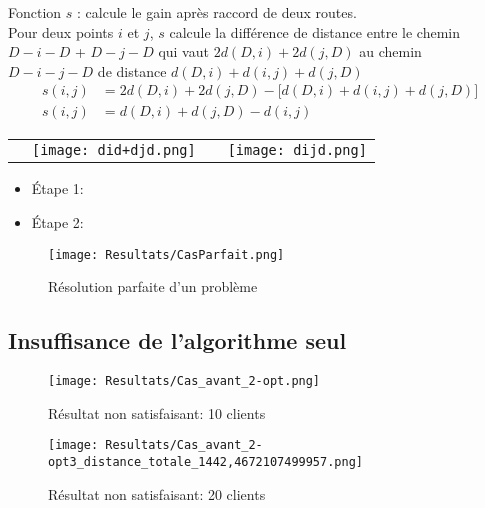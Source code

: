 \documentclass[10pt]{beamer}
\begin{document}
	\begin{frame}	
		\begin{definition}
			Fonction $s$ : calcule le gain après raccord de deux routes. \\Pour deux points $i$ et $j$, $s$ calcule la différence de distance entre le chemin \\$D-i-D$ + $D-j-D$ qui vaut $2d(D,i) + 2d(j,D)$ au chemin\\$D-i-j-D$ de distance $d(D,i) + d(i,j) + d(j,D)$
		\begin{align*}
			s(i,j) &= 2d(D,i) + 2d(j,D) - \lbrack d(D,i) + d(i,j) + d(j,D)\rbrack \\
			s(i,j) &= d(D,i) + d(j,D) - d(i,j)
		\end{align*}
		\end{definition}
		\pause
		\begin{tabular}{cccc}
			\;\;\;\;\;\;\;
			&
			\texttt{[image: did+djd.png]}
			&
			\;\;\;\;\;\;\;	
			\pause		
			&
			\texttt{[image: dijd.png]}			
		\end{tabular}
	\end{frame}

   \begin{frame}
       \begin{itemize}[label=-]
          \item Étape 1:
          \item Étape 2:
	   \end{itemize}
	\end{frame}

	\begin{frame}
		\begin{figure}
			\texttt{[image: Resultats/CasParfait.png]}
			\caption{Résolution parfaite d'un problème}	
		\end{figure}
	\end{frame}

	\subsection{Insuffisance de l'algorithme seul}
	   
	\begin{frame}
		\begin{figure}
			\texttt{[image: Resultats/Cas\_avant\_2-opt.png]}
			\caption{Résultat non satisfaisant: 10 clients}	
		\end{figure}
	\end{frame}
	\begin{frame}
		\begin{figure}
			\texttt{[image: Resultats/Cas\_avant\_2-opt3\_distance\_totale\_1442,4672107499957.png]}
			\caption{Résultat non satisfaisant: 20 clients}	
		\end{figure}
	\end{frame}
\end{document}
